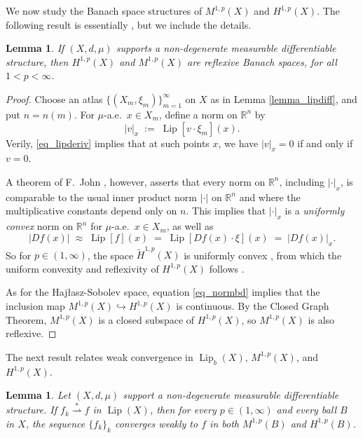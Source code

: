 \documentclass[reqno]{amsart}
\theoremstyle{plain}
\newtheorem{lemma}[thm]{Lemma}
\theoremstyle{definition}
\theoremstyle{remark}
\numberwithin{equation}{section}
\newcommand{\Lip}{\operatorname{Lip}}
\newcommand{\R}{\mathbb{R}}
\newcommand{\wsto}{\stackrel{*}{\rightharpoonup}}
\begin{document}
We now study the Banach space structures of $M^{1,p}(X)$ and $H^{1,p}(X)$.  The following result is essentially \cite[Thm 4.38(ii)]{Cheeger}, but we include the details.

\begin{lemma} \label{lemma_reflexive}
If $(X,d,\mu)$ supports a non-degenerate measurable differentiable structure, then $H^{1,p}(X)$ and $M^{1,p}(X)$ are reflexive Banach spaces, for all $1 < p < \infty$.
\end{lemma}

\begin{proof}
Choose an atlas $\{(X_m,\xi_m)\}_{m=1}^\infty$ on $X$ as in Lemma \ref{lemma_lipdiff}, and put $n = n(m)$. For $\mu$-a.e.\ $x \in X_m$, define a norm on $\R^n$ by 
$$
| v |_x \;:=\; \Lip[v \cdot \xi_m](x).
$$
Verily, \eqref{eq_lipderiv} implies that at such points $x$, we have $|v|_x = 0$ if and only if $v = 0$.

A theorem of F.\ John \cite{John}, however, asserts that every norm on $\R^n$, including $|\cdot|_x$, is comparable to the usual inner product norm $| \cdot |$ on $\R^n$ and where the multiplicative constants depend only on $n$.  This implies that $|\cdot|_x$ is a {\em uniformly convex} norm on $\R^n$ for $\mu$-a.e.\ $x \in X_m$, as well as
$$
|Df(x)| \;\approx\; \Lip[f](x) \;=\; \Lip[Df(x) \cdot \xi](x) \;=\; |Df(x)|_x.
$$
So for $p \in (1,\infty)$, the space $\tilde{H}^{1,p}(X)$ is uniformly convex \cite[Rmk 10.1.10]{handbook}, from which the uniform convexity and reflexivity of $H^{1,p}(X)$ follows \cite[\S26.6]{Kothe}.

As for the Haj{\l}asz-Sobolev space, equation \eqref{eq_normbd} implies that the inclusion map $M^{1,p}(X) \hookrightarrow H^{1,p}(X)$ is continuous.  By the Closed Graph Theorem, $M^{1,p}(X)$ is a closed subspace of $H^{1,p}(X)$, so $M^{1,p}(X)$ is also reflexive.
\end{proof}

The next result relates weak convergence in $\Lip_b(X)$, $M^{1,p}(X)$, and $H^{1,p}(X)$.

\begin{lemma}
Let $(X,d,\mu)$ support a non-degenerate measurable differentiable structure.  If $f_k \wsto f$ in $\Lip(X)$, then for every $p \in (1,\infty)$ and every ball $B$ in $X$, the sequence $\{f_k\}_k$ converges weakly to $f$ in both $M^{1,p}(B)$ and $H^{1,p}(B)$.
\end{lemma}
\end{document}
